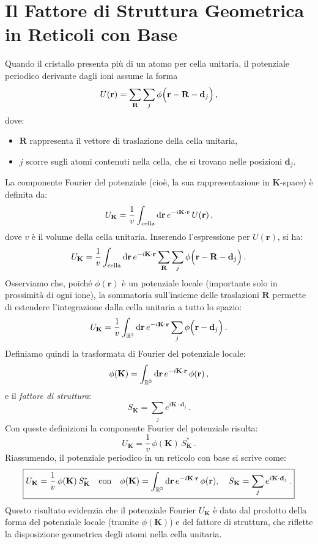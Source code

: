 \section{Il Fattore di Struttura Geometrica in Reticoli con Base}
Quando il cristallo presenta più di un atomo per cella unitaria, il potenziale periodico derivante dagli ioni assume la forma
\[
U(\mathbf{r}) = \sum_{\mathbf{R}} \sum_j \phi\Bigl(\mathbf{r} - \mathbf{R} - \mathbf{d}_j\Bigr)\,,
\]
dove:
\begin{itemize}
	\item \(\mathbf{R}\) rappresenta il vettore di traslazione della cella unitaria,
	\item \(j\) scorre sugli atomi contenuti nella cella, che si trovano nelle posizioni \(\mathbf{d}_j\).
\end{itemize}
La componente Fourier del potenziale (cioè, la sua rappresentazione in \(\mathbf{K}\)-space) è definita da:
\[
U_{\mathbf{K}} = \frac{1}{v} \int_{\text{cella}} \text{d}\mathbf{r}\, e^{-i\mathbf{K}\cdot\mathbf{r}}\, U(\mathbf{r})\,,
\]
dove \(v\) è il volume della cella unitaria.  
Inserendo l'espressione per \(U(\mathbf{r})\), si ha:
\[
U_{\mathbf{K}} = \frac{1}{v} \int_{\text{cella}} \text{d}\mathbf{r}\, e^{-i\mathbf{K}\cdot\mathbf{r}} \sum_{\mathbf{R}} \sum_j \phi\Bigl(\mathbf{r} - \mathbf{R} - \mathbf{d}_j\Bigr)\,.
\]
Osserviamo che, poiché \(\phi(\mathbf{r})\) è un potenziale locale (importante solo in prossimità di ogni ione), la sommatoria sull'insieme delle traslazioni \(\mathbf{R}\) permette di estendere l'integrazione dalla cella unitaria a tutto lo spazio:
\[
U_{\mathbf{K}} = \frac{1}{v} \int_{\mathbb{R}^3} \text{d}\mathbf{r}\, e^{-i\mathbf{K}\cdot\mathbf{r}} \sum_j \phi\Bigl(\mathbf{r} - \mathbf{d}_j\Bigr)\,.
\]
Definiamo quindi la trasformata di Fourier del potenziale locale:
\[
\phi(\mathbf{K}) = \int_{\mathbb{R}^3} \text{d}\mathbf{r}\, e^{-i\mathbf{K}\cdot\mathbf{r}}\, \phi(\mathbf{r})\,,
\]
e il \emph{fattore di struttura}:
\[
S_{\mathbf{K}} = \sum_j e^{i\mathbf{K}\cdot\mathbf{d}_j}\,.
\]
Con queste definizioni la componente Fourier del potenziale risulta:
\[
U_{\mathbf{K}} = \frac{1}{v}\, \phi(\mathbf{K})\, S_{\mathbf{K}}^*\,.
\]
Riassumendo, il potenziale periodico in un reticolo con base si scrive come:
\[
\boxed{ U_{\mathbf{K}} = \frac{1}{v}\, \phi(\mathbf{K})\, S_{\mathbf{K}}^* \quad \text{con} \quad \phi(\mathbf{K}) = \int_{\mathbb{R}^3} \text{d}\mathbf{r}\, e^{-i\mathbf{K}\cdot\mathbf{r}}\, \phi(\mathbf{r}), \quad S_{\mathbf{K}} = \sum_j e^{i\mathbf{K}\cdot\mathbf{d}_j}\,. }
\]
Questo risultato evidenzia che il potenziale Fourier \(U_{\mathbf{K}}\) è dato dal prodotto della forma del potenziale locale (tramite \(\phi(\mathbf{K})\)) e del fattore di struttura, che riflette la disposizione geometrica degli atomi nella cella unitaria.
